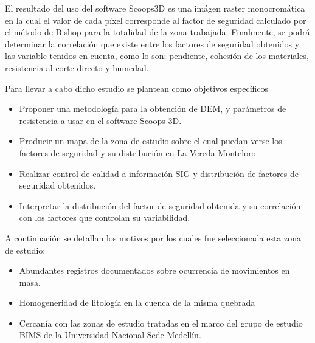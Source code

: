 El resultado del uso del software Scoops3D es una im\'agen raster monocrom\'atica en la cual el valor de cada p\'ixel corresponde al factor de seguridad calculado por el m\'etodo de Bishop para la totalidad de la zona trabajada. Finalmente, se podr\'a determinar la  correlaci\'on que existe entre los factores de seguridad obtenidos y las variable tenidos en cuenta, como lo son: pendiente, cohesi\'on de los materiales, resistencia al corte directo y humedad.

Para llevar a cabo dicho estudio se plantean como objetivos espec\'ificos 

\begin{itemize}
\item Proponer una metodolog\'ia para la obtenci\'on de DEM, y par\'ametros de resistencia a usar en el software Scoops 3D.
\item Producir un mapa de la zona de estudio sobre el cual puedan verse los factores de seguridad y su distribuci\'on en La Vereda Monteloro.
\item Realizar control de calidad a informaci\'on SIG y distribuci\'on de factores de seguridad obtenidos.
\item Interpretar la distribuci\'on del factor de seguridad obtenida y su correlaci\'on con los factores que controlan su variabilidad.


\end{itemize} 

A continuaci\'on se detallan los motivos por los cuales fue seleccionada esta zona de estudio:

\begin{itemize}
\item Abundantes registros documentados sobre ocurrencia de movimientos en masa.
\item Homogeneridad de litolog\'ia en la cuenca de la misma quebrada
\item Cercan\'ia con las zonas de estudio tratadas en el marco del grupo de estudio BIMS de la Universidad Nacional Sede Medell\'in.
\end{itemize}

